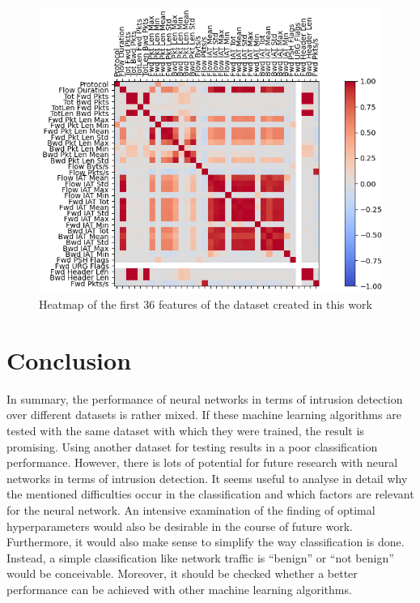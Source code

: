 \documentclass[conference]{IEEEtran}
\begin{document}
\begin{figure}[htbp]  
\centerline{\includegraphics[scale=0.8]{Heatmap-NeueDaten-0-35.png}}
\caption{Heatmap of the first 36 features of the dataset created in this work}
\label{fig:hm2}
\end{figure}

\newpage

\section{Conclusion}\label{conclusion}
In summary, the performance of neural networks in terms of intrusion detection over different datasets is rather mixed. If these machine learning algorithms are tested with the same dataset with which they were trained, the result is promising. Using another dataset for testing results in a poor classification performance. However, there is lots of potential for future research with neural networks in terms of intrusion detection. It seems useful to analyse in detail why the mentioned difficulties occur in the classification and which factors are relevant for the neural network. An intensive examination of the finding of optimal hyperparameters would also be desirable in the course of future work. Furthermore, it would also make sense to simplify the way classification is done. Instead, a simple classification like network traffic is “benign” or “not benign” would be conceivable. Moreover, it should be checked whether a better performance can be achieved with other machine learning algorithms.
\end{document}
